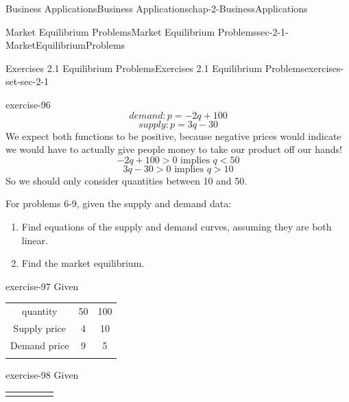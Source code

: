 \documentclass[oneside,10pt,]{book}
\numberwithin{equation}{section}
\newcommand{\hrulethin}  {\noalign{\hrule height 0.04em}}
\newcommand{\hrulemedium}{\noalign{\hrule height 0.07em}}
\newcommand{\hrulethick} {\noalign{\hrule height 0.11em}}
\newcommand{\lt}{<}
\newcommand{\gt}{>}
\begin{document}
\begin{chapterptx}{Business Applications}{}{Business Applications}{}{}{chap-2-BusinessApplications}
\begin{sectionptx}{Market Equilibrium Problems}{}{Market Equilibrium Problems}{}{}{sec-2-1-MarketEquilibriumProblems}
\begin{exercises-subsection-numberless}{Exercises 2.1 Equilibrium Problems}{}{Exercises 2.1 Equilibrium Problems}{}{}{exercises-set-sec-2-1}
\begin{divisionexercise}{5}{}{}{exercise-96}
\begin{equation*}
demand:   p=-2 q+100
\end{equation*}
%
\begin{equation*}
supply:   p=3 q-30
\end{equation*}
\hypertarget{p-603}{}%
We expect both functions to be positive, because negative prices would indicate we would have to actually give people money to take our product off our hands!%
%
\begin{equation*}
-2 q+100\gt 0\text{  implies }  q\lt 50
\end{equation*}
%
\begin{equation*}
3 q-30\gt 0  \text{ implies }  q\gt 10
\end{equation*}
\hypertarget{p-604}{}%
So we should only consider quantities between 10 and 50.%
\end{divisionexercise}%
\par\medskip\noindent%
\hypertarget{exercisegroup-5}{}%
\hypertarget{p-605}{}%
For problems 6-9, given the supply and demand data:%
\leavevmode%
\begin{enumerate}[label=(\alph*)]
\item\hypertarget{li-170}{}\hypertarget{p-606}{}%
Find equations of the supply and demand curves, assuming they are both linear.%
\item\hypertarget{li-171}{}\hypertarget{p-607}{}%
Find the market equilibrium.%
\end{enumerate}
\begin{exercisegroup}
\begin{divisionexerciseeg}{6}{}{}{exercise-97}%
\hypertarget{p-608}{}%
Given%
\begin{sidebyside}{1}{0}{0}{0}%
\begin{sbspanel}{1}%
{\centering%
\begin{tabular}{ccc}\hrulethick
quantity&50&100\tabularnewline\hrulethin
Supply price&4&10\tabularnewline\hrulemedium
Demand price&9&5\tabularnewline\hrulemedium
\end{tabular}
\par}
\end{sbspanel}%
\end{sidebyside}%
\end{divisionexerciseeg}%
\begin{divisionexerciseeg}{7}{}{}{exercise-98}%
\hypertarget{p-609}{}%
Given%
\begin{sidebyside}{1}{0}{0}{0}%
\begin{sbspanel}{1}%
{\centering%
\begin{tabular}{ccccc}\hrulethick

\end{tabular}}
\end{sbspanel}
\end{sidebyside}
\end{divisionexerciseeg}
\end{exercisegroup}
\end{exercises-subsection-numberless}
\end{sectionptx}
\end{chapterptx}
\end{document}
